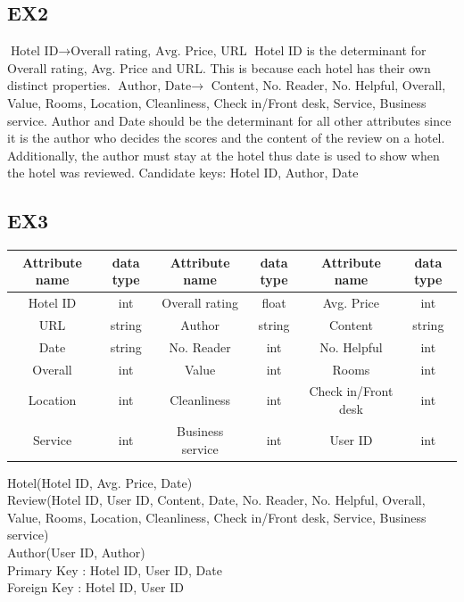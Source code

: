 \documentclass{article}
\begin{document}
	\subsection{EX2}
	\begin{math}
		\textrm{Hotel ID}
		\rightarrow
		\textrm{Overall rating, Avg. Price, URL}
	\end{math}
	\newline
	Hotel ID is the determinant for Overall rating, Avg. Price and URL. This is because each hotel has their own distinct properties.
	\newline
	\begin{math}
		\textrm{Author, Date}
		\rightarrow
	\end{math}
	Content, No. Reader, No. Helpful, Overall, Value, Rooms, Location, Cleanliness, Check in/Front desk, Service, Business service.
	\newline
	Author and Date should be the determinant for all other attributes since it is the author who decides the scores and the content of the review on a hotel. Additionally, the author must stay at the hotel thus date is used to show when the hotel was reviewed.
	\newline
	Candidate keys:
	\newline
	Hotel ID, Author, Date
	\subsection{EX3}
	\begin{center}
		\begin{tabular}{||c c | c c | c c ||} 
			\hline
			Attribute name & data type & Attribute name & data type & Attribute name & data type \\
			\hline
			Hotel ID & int & Overall rating & float & Avg. Price & int \\ 
			URL & string & Author & string & Content & string \\ 
			Date & string & No. Reader & int & No. Helpful & int \\ 
			Overall & int & Value & int & Rooms & int \\
			Location & int & Cleanliness & int & Check in/Front desk & int \\
			Service & int & Business service & int & User ID & int \\
			\hline
		\end{tabular}
	\end{center}
	Hotel(Hotel ID, Avg. Price, Date) \\
	Review(Hotel ID, User ID, Content, Date, No. Reader, No. Helpful, Overall, Value, Rooms, Location, Cleanliness, Check in/Front desk, Service, Business service) \\
	Author(User ID, Author) \\
	Primary Key : Hotel ID, User ID, Date \\
	Foreign Key : Hotel ID, User ID \\
	
\end{document}
